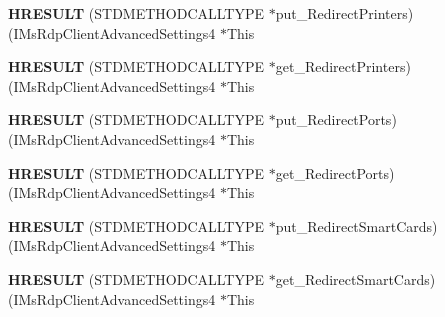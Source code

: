 \begin{DoxyCompactItemize}
\item 
\mbox{\label{struct_i_ms_rdp_client_advanced_settings4_vtbl_aaec94c2b7b26e97f7b8e3cb09b70a0ab}} 
{\bfseries H\+R\+E\+S\+U\+LT} (S\+T\+D\+M\+E\+T\+H\+O\+D\+C\+A\+L\+L\+T\+Y\+PE $\ast$put\+\_\+\+Redirect\+Printers)(I\+Ms\+Rdp\+Client\+Advanced\+Settings4 $\ast$This
\item 
\mbox{\label{struct_i_ms_rdp_client_advanced_settings4_vtbl_a376eefe33db8fe926dcd11e6e7f6e3b3}} 
{\bfseries H\+R\+E\+S\+U\+LT} (S\+T\+D\+M\+E\+T\+H\+O\+D\+C\+A\+L\+L\+T\+Y\+PE $\ast$get\+\_\+\+Redirect\+Printers)(I\+Ms\+Rdp\+Client\+Advanced\+Settings4 $\ast$This
\item 
\mbox{\label{struct_i_ms_rdp_client_advanced_settings4_vtbl_add1db4a3b25e68c3799e127320af9680}} 
{\bfseries H\+R\+E\+S\+U\+LT} (S\+T\+D\+M\+E\+T\+H\+O\+D\+C\+A\+L\+L\+T\+Y\+PE $\ast$put\+\_\+\+Redirect\+Ports)(I\+Ms\+Rdp\+Client\+Advanced\+Settings4 $\ast$This
\item 
\mbox{\label{struct_i_ms_rdp_client_advanced_settings4_vtbl_ab755c97ffa77ea0e7c9a9effa7eed4f1}} 
{\bfseries H\+R\+E\+S\+U\+LT} (S\+T\+D\+M\+E\+T\+H\+O\+D\+C\+A\+L\+L\+T\+Y\+PE $\ast$get\+\_\+\+Redirect\+Ports)(I\+Ms\+Rdp\+Client\+Advanced\+Settings4 $\ast$This
\item 
\mbox{\label{struct_i_ms_rdp_client_advanced_settings4_vtbl_a0cd6d4a6aeabd51e7a47f30f82c262bd}} 
{\bfseries H\+R\+E\+S\+U\+LT} (S\+T\+D\+M\+E\+T\+H\+O\+D\+C\+A\+L\+L\+T\+Y\+PE $\ast$put\+\_\+\+Redirect\+Smart\+Cards)(I\+Ms\+Rdp\+Client\+Advanced\+Settings4 $\ast$This
\item 
\mbox{\label{struct_i_ms_rdp_client_advanced_settings4_vtbl_ac30d51b02e24bd788c8785347b2606fc}} 
{\bfseries H\+R\+E\+S\+U\+LT} (S\+T\+D\+M\+E\+T\+H\+O\+D\+C\+A\+L\+L\+T\+Y\+PE $\ast$get\+\_\+\+Redirect\+Smart\+Cards)(I\+Ms\+Rdp\+Client\+Advanced\+Settings4 $\ast$This
\item 
\mbox{\label{struct_i_ms_rdp_client_advanced_settings4_vtbl_ade9db091a2d8d8b583019d99721f9429}} 

\end{DoxyCompactItemize}
